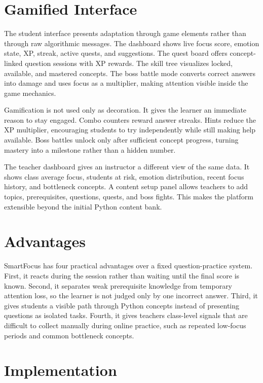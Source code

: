 \documentclass[conference]{IEEEtran}
\begin{document}
\section{Gamified Interface}

The student interface presents adaptation through game elements rather than through raw algorithmic messages. The dashboard shows live focus score, emotion state, XP, streak, active quests, and suggestions. The quest board offers concept-linked question sessions with XP rewards. The skill tree visualizes locked, available, and mastered concepts. The boss battle mode converts correct answers into damage and uses focus as a multiplier, making attention visible inside the game mechanics.

Gamification is not used only as decoration. It gives the learner an immediate reason to stay engaged. Combo counters reward answer streaks. Hints reduce the XP multiplier, encouraging students to try independently while still making help available. Boss battles unlock only after sufficient concept progress, turning mastery into a milestone rather than a hidden number.

The teacher dashboard gives an instructor a different view of the same data. It shows class average focus, students at risk, emotion distribution, recent focus history, and bottleneck concepts. A content setup panel allows teachers to add topics, prerequisites, questions, quests, and boss fights. This makes the platform extensible beyond the initial Python content bank.

\section{Advantages}

SmartFocus has four practical advantages over a fixed question-practice system. First, it reacts during the session rather than waiting until the final score is known. Second, it separates weak prerequisite knowledge from temporary attention loss, so the learner is not judged only by one incorrect answer. Third, it gives students a visible path through Python concepts instead of presenting questions as isolated tasks. Fourth, it gives teachers class-level signals that are difficult to collect manually during online practice, such as repeated low-focus periods and common bottleneck concepts.

\section{Implementation}
\end{document}
